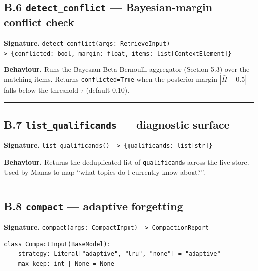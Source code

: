 \subsection{\texorpdfstring{B.6 \texttt{detect\_conflict} --- Bayesian-margin conflict check}{B.6 detect\_conflict --- Bayesian-margin conflict check}}\label{b.6-detect_conflict-bayesian-margin-conflict-check}

\textbf{Signature.} \texttt{detect\_conflict(args:\ RetrieveInput)\ -\textgreater{}\ \{conflicted:\ bool,\ margin:\ float,\ items:\ list{[}ContextElement{]}\}}

\textbf{Behaviour.} Runs the Bayesian Beta-Bernoulli aggregator (Section 5.3) over the matching items. Returns \texttt{conflicted=True} when the posterior margin \(|\bar{H} - 0.5|\) falls below the threshold \(\tau\) (default 0.10).

\begin{center}\rule{0.5\linewidth}{0.5pt}\end{center}

\subsection{\texorpdfstring{B.7 \texttt{list\_qualificands} --- diagnostic surface}{B.7 list\_qualificands --- diagnostic surface}}\label{b.7-list_qualificands-diagnostic-surface}

\textbf{Signature.} \texttt{list\_qualificands()\ -\textgreater{}\ \{qualificands:\ list{[}str{]}\}}

\textbf{Behaviour.} Returns the deduplicated list of \texttt{qualificand}s across the live store. Used by Manas to map ``what topics do I currently know about?''.

\begin{center}\rule{0.5\linewidth}{0.5pt}\end{center}

\subsection{\texorpdfstring{B.8 \texttt{compact} --- adaptive forgetting}{B.8 compact --- adaptive forgetting}}\label{b.8-compact-adaptive-forgetting}

\textbf{Signature.} \texttt{compact(args:\ CompactInput)\ -\textgreater{}\ CompactionReport}

\begin{verbatim}
class CompactInput(BaseModel):
    strategy: Literal["adaptive", "lru", "none"] = "adaptive"
    max_keep: int | None = None
\end{verbatim}

